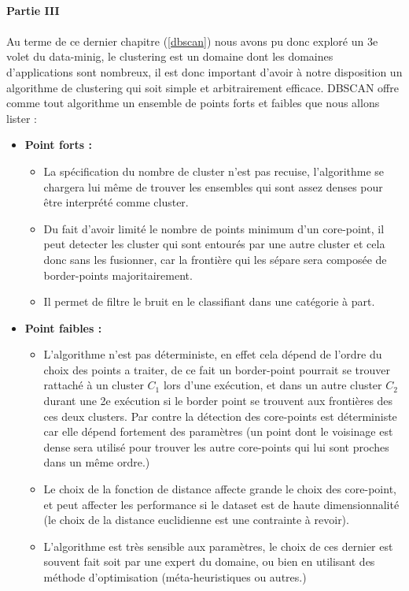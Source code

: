 \documentclass[12pt]{report}
\begin{document}
		\paragraph{Partie III}
		\paragraph{}
			Au terme de ce dernier chapitre (\ref{dbscan}) nous avons pu donc exploré un 3e volet du data-minig, le clustering est un domaine dont les domaines d'applications sont nombreux, il est donc important d'avoir à notre disposition un algorithme de clustering qui soit simple et arbitrairement efficace.
			DBSCAN offre comme tout algorithme un ensemble de points forts et faibles que nous allons lister : 
			\begin{itemize}
				\item \textbf{Point forts : }
				\begin{itemize}
					\item  La spécification du nombre de cluster n'est pas recuise, l'algorithme se chargera lui même de trouver les ensembles qui sont assez denses pour être interprété comme cluster.
					\item Du fait d'avoir limité le nombre de points minimum d'un core-point, il peut detecter les cluster qui sont entourés par une autre cluster et cela donc sans les fusionner, car la frontière qui les sépare sera composée de border-points majoritairement.
					\item Il permet de filtre le bruit en le classifiant dans une catégorie à part.
					\end{itemize}
				\item \textbf{Point faibles : }
				\begin{itemize}
					\item  L'algorithme n'est pas déterministe, en effet cela dépend de l'ordre du choix des points a traiter, de ce fait un border-point pourrait se trouver rattaché à un cluster $C_1$ lors d'une exécution, et dans un autre cluster $C_2$ durant une 2e exécution si le border point se trouvent aux frontières des ces deux clusters. Par contre la détection des core-points est déterministe car elle dépend fortement des paramètres (un point dont le voisinage est dense sera utilisé pour trouver les autre core-points qui lui sont proches dans un même ordre.)
					\item Le choix de la fonction de distance affecte grande le choix des core-point, et peut affecter les performance si le dataset est de haute dimensionnalité (le choix de la distance euclidienne est une contrainte à revoir).
					\item L'algorithme est très sensible aux paramètres, le choix de ces dernier est souvent fait soit par une expert du domaine, ou bien en utilisant des méthode d'optimisation (méta-heuristiques ou autres.)
				\end{itemize}
			\end{itemize}
%


\end{document}
